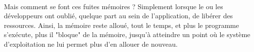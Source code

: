 {  \paragraph{} Mais comment se font ces fuites mémoires ? Simplement lorsque le ou les développeurs
  ont oublié, quelque part au sein de l'application, de libérer des ressources. Ainsi, la mémoire reste
  alloué, tout le temps, et plus le programme s'exécute, plus il "bloque" de la mémoire, jusqu'à atteindre
  un point où le système d'exploitation ne lui permet plus d'en allouer de nouveau.

}

